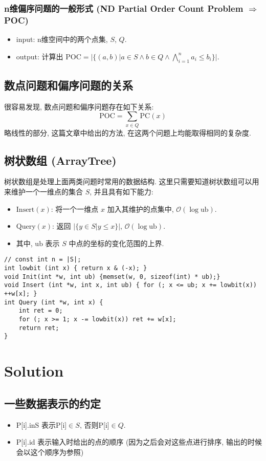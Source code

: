 \documentclass[11pt]{article}
\begin{document}
\subsubsection{n维偏序问题的一般形式 (ND Partial Order Count Problem \(\Rightarrow\) POC)}
\label{sec:org6061759}
\begin{itemize}
\item input: n维空间中的两个点集, \(S\), \(Q\).
\item output: 计算出 \(\mbox{POC} = |\{ (a, b) | a\in S\land b\in Q\land\bigwedge_{i=1}^n a_i\leq b_i\}|\).
\end{itemize}
\subsection{数点问题和偏序问题的关系}
\label{sec:org79d5b9e}
很容易发现, 数点问题和偏序问题存在如下关系:
\[
    \mbox{POC} = \sum_{x \in Q} \mbox{PC}(x)
   \]
略线性的部分, 这篇文章中给出的方法, 在这两个问题上均能取得相同的复杂度.
\subsection{树状数组 (ArrayTree)}
\label{sec:orgcc05254}
树状数组是处理上面两类问题时常用的数据结构.
这里只需要知道树状数组可以用来维护一个一维点的集合 \(S\), 并且具有如下能力:
\begin{itemize}
\item \(\mbox{Insert}(x)\): 将一个一维点 \(x\) 加入其维护的点集中, \(\mathcal{O}(\log \mbox{ub})\).
\item \(\mbox{Query}(x)\): 返回 \(|\{y\in S| y\leq x\}|\), \(\mathcal{O}(\log \mbox{ub})\).
\item 其中, \(\mbox{ub}\) 表示 \(S\) 中点的坐标的变化范围的上界.
\end{itemize}
\begin{verbatim}
// const int n = |S|;
int lowbit (int x) { return x & (-x); }
void Init(int *w, int ub) {memset(w, 0, sizeof(int) * ub);}
void Insert (int *w, int x, int ub) { for (; x <= ub; x += lowbit(x)) ++w[x]; }
int Query (int *w, int x) { 
    int ret = 0;
    for (; x >= 1; x -= lowbit(x)) ret += w[x];
    return ret;
}
\end{verbatim}

\section{Solution}
\label{sec:orgc9e7224}
\subsection{一些数据表示的约定}
\label{sec:org31af338}
\begin{itemize}
\item P[i].inS 表示P[i]\(\in S\), 否则P[i]\(\in Q\).
\item P[i].id 表示输入时给出的点的顺序 (因为之后会对这些点进行排序, 输出的时候会以这个顺序为参照)
\end{itemize}
\end{document}
